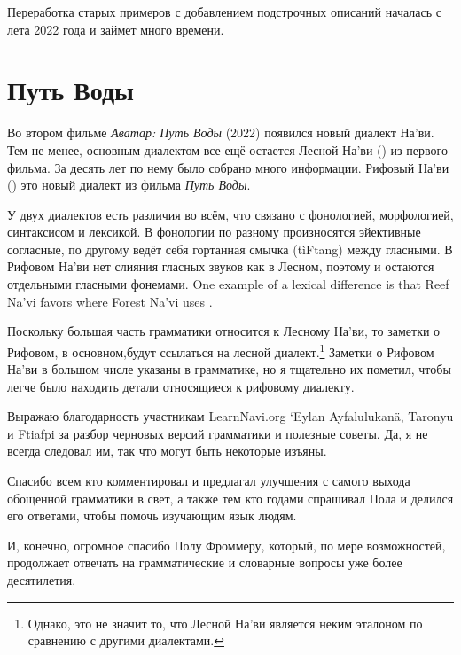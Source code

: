 Переработка старых примеров с добавлением подстрочных описаний
началась с лета 2022 года и займет много времени.


\section{Путь Воды}
Во втором фильме \textit{Аватар: Путь Воды} (2022) появился
новый диалект На'ви. Тем не менее, основным диалектом
все ещё остается Лесной На'ви () из первого фильма. За десять лет по нему было собрано много информации.
Рифовый На'ви () это новый диалект из фильма \textit{Путь Воды}.

У двух диалектов есть различия во всём, что связано с фонологией, морфологией, синтаксисом и лексикой. В фонологии по разному произносятся эйективные согласные, по другому ведёт себя гортанная смычка  (tìFtang) между гласными. В Рифовом На'ви нет слияния гласных звуков как в Лесном, поэтому 
и  остаются отдельными гласными фонемами.
One example of a lexical difference is that Reef Na'vi
favors   where Forest Na'vi uses .

Поскольку большая часть грамматики относится к Лесному На'ви, то заметки о Ри\-фо\-вом, в
основном,будут ссылаться на лесной диалект.\footnote{Однако, это не  значит то, что Лесной На'ви является
неким эталоном по сравнению с другими диалектами.}
Заметки о Рифовом На'ви в большом числе указаны в грамматике, но
я тщательно их пометил, чтобы легче было находить детали
относящиеся к рифовому диалекту.



\vfill
Выражаю благодарность участникам LearnNavi.org `Eylan Ayfalulukanä,
Taronyu
и Ftia\-fpi за разбор черновых версий грамматики и полезные
советы. Да, я не всегда следовал им, так что могут быть некоторые
изъяны.

Спасибо всем кто комментировал и предлагал улучшения с самого
выхода обощенной грамматики в свет, а также тем кто годами спрашивал 
Пола и делился его ответами, чтобы помочь изучающим язык людям.

И, конечно, огромное спасибо Полу Фроммеру, который, по мере
возможностей, про\-дол\-жа\-ет отвечать на грамматические и
словарные вопросы уже более десятилетия.



\bigskip
